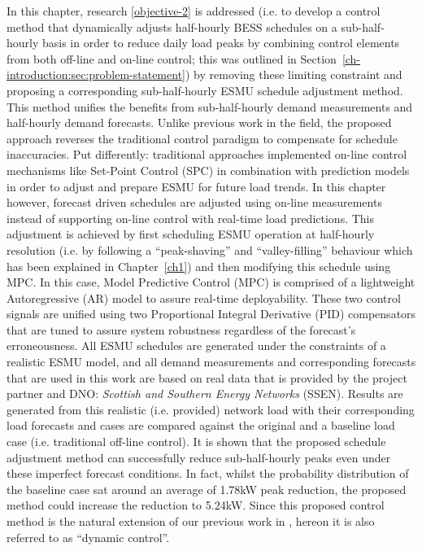 In this chapter, research \ref{objective-2} is addressed (i.e. to develop a control method that dynamically adjusts half-hourly BESS schedules on a sub-half-hourly basis in order to reduce daily load peaks by combining control elements from both off-line and on-line control; this was outlined in Section~\ref{ch-introduction:sec:problem-statement}) by removing these limiting constraint and proposing a corresponding sub-half-hourly ESMU schedule adjustment method.
This method unifies the benefits from sub-half-hourly demand measurements and half-hourly demand forecasts.
Unlike previous work in the field, the proposed approach reverses the traditional control paradigm to compensate for schedule inaccuracies.
Put differently: traditional approaches implemented on-line control mechanisms like Set-Point Control (SPC) in combination with prediction models in order to adjust and prepare ESMU for future load trends.
In this chapter however, forecast driven schedules are adjusted using on-line measurements instead of supporting on-line control with real-time load predictions.
This adjustment is achieved by first scheduling ESMU operation at half-hourly resolution (i.e. by following a ``peak-shaving'' and ``valley-filling'' behaviour which has been explained in Chapter~\ref{ch1}) and then modifying this schedule using MPC.
In this case, Model Predictive Control (MPC) is comprised of a lightweight Autoregressive (AR) model to assure real-time deployability.
These two control signals are unified using two Proportional Integral Derivative (PID) compensators that are tuned to assure system robustness regardless of the forecast's erroneousness.
All ESMU schedules are generated under the constraints of a realistic ESMU model, and all demand measurements and corresponding forecasts that are used in this work are based on real data that is provided by the project partner and DNO: \textit{Scottish and Southern Energy Networks} (SSEN).
Results are generated from this realistic (i.e. provided) network load with their corresponding load forecasts and cases are compared against the original and a baseline load case (i.e. traditional off-line control).
It is shown that the proposed schedule adjustment method can successfully reduce sub-half-hourly peaks even under these imperfect forecast conditions.
In fact, whilst the probability distribution of the baseline case sat around an average of 1.78kW peak reduction, the proposed method could increase the reduction to 5.24kW.
Since this proposed control method is the natural extension of our previous work in \cite{Zangs2016}, hereon it is also referred to as ``dynamic control''.

